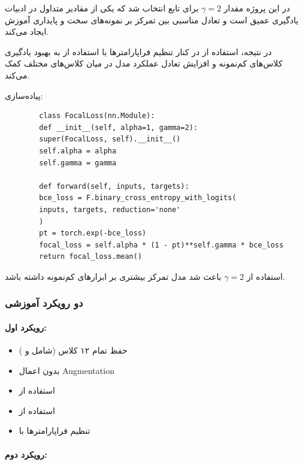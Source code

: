 \documentclass{article}
\begin{document}
در این پروژه مقدار $\gamma = 2$ برای تابع  انتخاب شد که یکی از مقادیر متداول در ادبیات یادگیری عمیق است و تعادل مناسبی بین تمرکز بر نمونه‌های سخت و پایداری آموزش ایجاد می‌کند.

در نتیجه، استفاده از  در کنار تنظیم فراپارامترها با استفاده از  
به بهبود یادگیری کلاس‌های کم‌نمونه و افزایش تعادل عملکرد مدل در میان کلاس‌های مختلف کمک می‌کند.

پیاده‌سازی:

\begin{LTR}
	\begin{verbatim}
		class FocalLoss(nn.Module):
		def __init__(self, alpha=1, gamma=2):
		super(FocalLoss, self).__init__()
		self.alpha = alpha
		self.gamma = gamma
		
		def forward(self, inputs, targets):
		bce_loss = F.binary_cross_entropy_with_logits(
		inputs, targets, reduction='none'
		)
		pt = torch.exp(-bce_loss)
		focal_loss = self.alpha * (1 - pt)**self.gamma * bce_loss
		return focal_loss.mean()
	\end{verbatim}
\end{LTR}

استفاده از $\gamma=2$ باعث شد مدل تمرکز بیشتری بر ابزارهای کم‌نمونه داشته باشد.


\subsubsection{دو رویکرد آموزشی}

\paragraph{رویکرد اول:}

\begin{itemize}
	\item حفظ تمام ۱۲ کلاس (شامل  و )
	\item بدون اعمال Augmentation
	\item استفاده از 
	\item استفاده از 
	\item تنظیم فراپارامترها با 
\end{itemize}


\paragraph{رویکرد دوم:}
\end{document}
